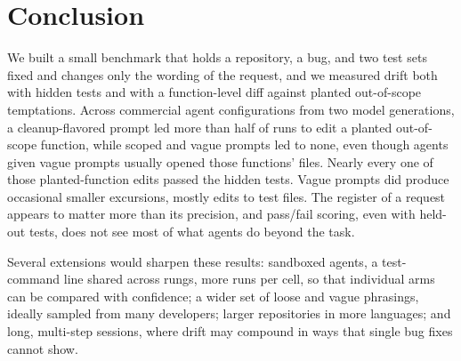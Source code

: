 \section{Conclusion}
\label{sec:conclusion}

We built a small benchmark that holds a repository, a bug, and two test sets
fixed and changes only the wording of the request, and we measured drift both
with hidden tests and with a function-level diff against planted
out-of-scope temptations. Across \NConfigsDistinct{} commercial agent configurations
from two model generations, a cleanup-flavored prompt led more than half of
runs to edit a planted out-of-scope function, while scoped and vague prompts
led to none, even though agents given vague prompts usually opened those
functions' files. Nearly every one of those planted-function edits passed the
hidden tests. Vague prompts did produce occasional smaller excursions, mostly
edits to test files. The register of a request
appears to matter more than its precision, and pass/fail scoring, even with
held-out tests, does not see most of what agents do beyond the task.

Several extensions would sharpen these results: sandboxed agents, a
test-command line shared across rungs, more runs per cell, so that
individual arms can be compared with confidence; a wider set of loose and
vague phrasings, ideally sampled from many developers; larger repositories in
more languages; and long, multi-step sessions, where drift may compound in
ways that single bug fixes cannot show.
